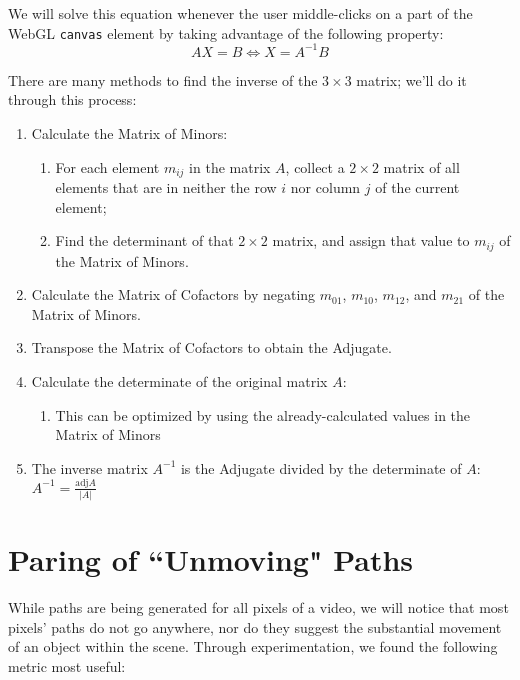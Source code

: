\par We will solve this equation whenever the user middle-clicks on a part of the WebGL \texttt{canvas} element by taking advantage of the following property:
    \begin{equation}
    AX=B \iff X=A^{-1}B
    \end{equation}
\par There are many methods to find the inverse of the $3 \times 3$ matrix; we'll do it through this process: \cite{matlinsys}
\begin{enumerate}
    \item Calculate the Matrix of Minors:
        \begin{enumerate}
        \item For each element $m_{ij}$ in the matrix $A$, collect a $2 \times 2$ matrix of all elements that are in neither the row $i$ nor column $j$ of the current element;
        \item Find the determinant of that $2 \times 2$ matrix, and assign that value to $m_{ij}$ of the Matrix of Minors.
        \end{enumerate}
    \item Calculate the Matrix of Cofactors by negating $m_{01}$, $m_{10}$, $m_{12}$, and $m_{21}$ of the Matrix of Minors.
    \item Transpose the Matrix of Cofactors to obtain the Adjugate.
    \item Calculate the determinate of the original matrix $A$:
        \begin{enumerate}
        \item This can be optimized by using the already-calculated values in the Matrix of Minors
        \end{enumerate}
    \item The inverse matrix $A^{-1}$ is the Adjugate divided by the determinate of $A$: $A^{-1}=\frac{\text{adj}A}{|A|}$

\end{enumerate}

\section{Paring of ``Unmoving" Paths}
\label{paring}
While paths are being generated for all pixels of a video, we will notice that most pixels' paths do not go anywhere, nor do they suggest the substantial movement of an object within the scene. Through experimentation, we found the following metric most useful:

